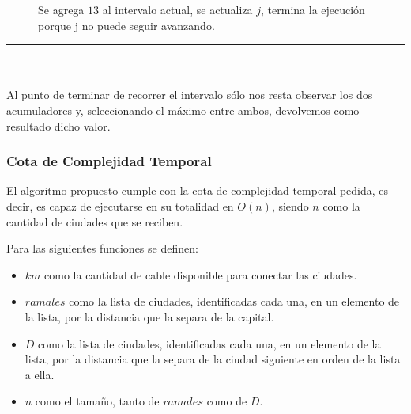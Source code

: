 \documentclass[spanish,a4paper]{article}
\newcommand{\linea}{\noindent\rule{15cm}{0.4pt}}
\begin{document}
\begin{figure}[H]
\caption{Se agrega $13$ al intervalo actual, se actualiza $j$, termina la ejecución porque j no puede seguir avanzando.}
\end{figure}
\linea \\ \\


Al punto de terminar de recorrer el intervalo sólo nos resta observar los dos acumuladores y, seleccionando el máximo entre ambos, devolvemos como resultado dicho valor.

\subsubsection{Cota de Complejidad Temporal}

El algoritmo propuesto cumple con la cota de complejidad temporal pedida, es decir, es capaz de ejecutarse en su totalidad en $O(n)$, siendo $n$ como la cantidad de ciudades que se reciben.

Para las siguientes funciones se definen:

\begin{itemize}
\item $km$ como la cantidad de cable disponible para conectar las ciudades.
\item $ramales$ como la lista de ciudades, identificadas cada una, en un elemento de la lista, por la distancia que la separa de la capital.
\item $D$ como la lista de ciudades, identificadas cada una, en un elemento de la lista, por la distancia que la separa de la ciudad siguiente en orden de la lista a ella.
\item $n$ como el tamaño, tanto de $ramales$ como de $D$.
\end{itemize}
\end{document}
